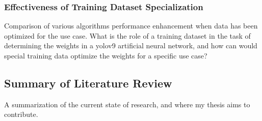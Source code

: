 \subsubsection{Effectiveness of Training Dataset Specialization}
\label{sec:dataset_specialization}
Comparison of various algorithms performance enhancement when data has been optimized for the use case. What is the role of a training dataset in the task of determining the weights in a yolov9 artificial neural network, and how can would special training data optimize the weights for a specific use case?



\subsection{Summary of Literature Review}
A summarization of the current state of research, and where my thesis aims to contribute.
